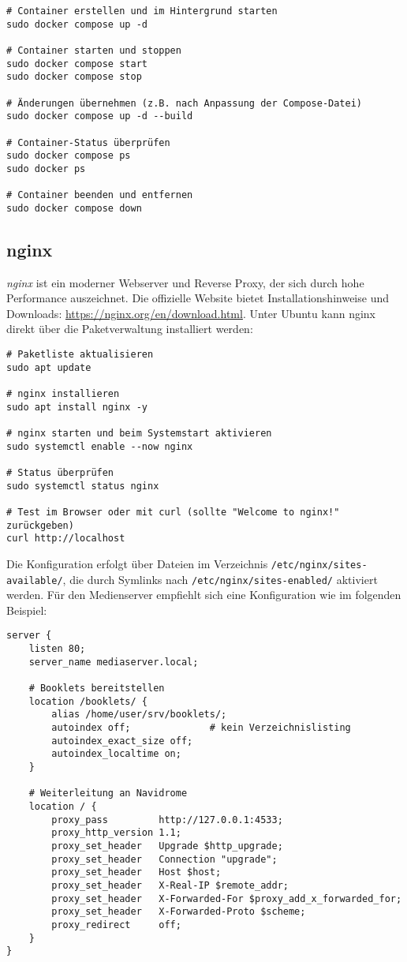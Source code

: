 \documentclass[12pt,a4paper]{report}
\begin{document}
\begin{enumerate}
    \begin{verbatim}
# Container erstellen und im Hintergrund starten
sudo docker compose up -d

# Container starten und stoppen
sudo docker compose start
sudo docker compose stop

# Änderungen übernehmen (z.B. nach Anpassung der Compose-Datei)
sudo docker compose up -d --build

# Container-Status überprüfen
sudo docker compose ps
sudo docker ps

# Container beenden und entfernen
sudo docker compose down
    \end{verbatim}
  \end{enumerate}

  \subsection{nginx}  
  \emph{nginx} ist ein moderner Webserver und Reverse Proxy, der sich durch hohe Performance auszeichnet.  
  Die offizielle Website bietet Installationshinweise und Downloads: \url{https://nginx.org/en/download.html}.  
  Unter Ubuntu kann nginx direkt über die Paketverwaltung installiert werden:

  \begin{verbatim}
# Paketliste aktualisieren
sudo apt update

# nginx installieren
sudo apt install nginx -y

# nginx starten und beim Systemstart aktivieren
sudo systemctl enable --now nginx

# Status überprüfen
sudo systemctl status nginx

# Test im Browser oder mit curl (sollte "Welcome to nginx!" zurückgeben)
curl http://localhost
  \end{verbatim} 

  Die Konfiguration erfolgt über Dateien im Verzeichnis \texttt{/etc/nginx/sites-available/}, 
  die durch Symlinks nach \texttt{/etc/nginx/sites-enabled/} aktiviert werden.  
  Für den Medienserver empfiehlt sich eine Konfiguration wie im folgenden Beispiel:  

  \begin{verbatim}
server {
    listen 80;
    server_name mediaserver.local;

    # Booklets bereitstellen
    location /booklets/ {
        alias /home/user/srv/booklets/;
        autoindex off;              # kein Verzeichnislisting
        autoindex_exact_size off;
        autoindex_localtime on;
    }

    # Weiterleitung an Navidrome
    location / {
        proxy_pass         http://127.0.0.1:4533;
        proxy_http_version 1.1;
        proxy_set_header   Upgrade $http_upgrade;
        proxy_set_header   Connection "upgrade";
        proxy_set_header   Host $host;
        proxy_set_header   X-Real-IP $remote_addr;
        proxy_set_header   X-Forwarded-For $proxy_add_x_forwarded_for;
        proxy_set_header   X-Forwarded-Proto $scheme;
        proxy_redirect     off;
    }
}
  \end{verbatim}  
\end{document}
